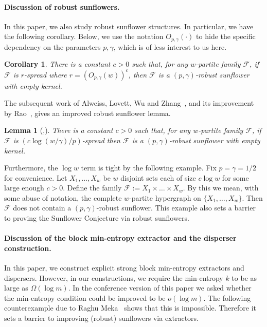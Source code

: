 \documentclass[11pt]{article}
\numberwithin{equation}{section}
\newtheorem{lemma}[theorem]{Lemma}
\newtheorem{corollary}[theorem]{Corollary}
\theoremstyle{definition}
\theoremstyle{plain}
\newcommand{\calF}{\mathcal{F}} %
\begin{document}
\paragraph{Discussion of robust sunflowers.}
In this paper, we also study robust sunflower structures.
In particular, we have the following corollary. Below, we use
the notation $O_{p,\gamma}(\cdot)$ to hide the specific dependency
on the parameters $p,\gamma$, which is of less interest to us here.

\begin{corollary} There is a constant $c>0$ such that, for any
%
$w$-partite  %
family $\calF$, if $\calF$ is $r$-spread where
$r=(O_{p,\gamma} (w))^c$, then $\calF$ is a
$(p, \gamma)$-robust sunflower with empty kernel.
\end{corollary}

The subsequent work of Alweiss, Lovett, Wu and
Zhang~\cite{alweiss2020improved},  and its improvement by
Rao~\cite{rao2020coding},
gives an improved robust sunflower lemma.

\begin{lemma}[\cite{alweiss2020improved},\cite{rao2020coding}]  %
There is a constant $c>0$ such that, for any
$w$-partite family $\calF$,
if $\calF$ is $(c\log(w/\gamma)/p)$-spread then 
$\calF$ is a $(p, \gamma)$-robust sunflower with empty kernel.
\end{lemma}
Furthermore, the $\log w$ term is tight by the following example. Fix
$p=\gamma=1/2$ for convenience. Let $X_1,\dots,X_w$ be $w$ disjoint sets
each of size $c \log w$ for some large enough $c>0$. Define the family
$\calF:=X_{1}\times\dots\times X_w$.
%
%
%
%
By this we mean, with some abuse of notation,
the complete $w$-partite hypergraph on $\{X_1,\dots,X_w\}$.  %
Then $\calF$
does not contain a $(p, \gamma)$-robust sunflower. This example also
sets a barrier to proving 
the Sunflower Conjecture via robust sunflowers.

\paragraph{Discussion of the block min-entropy extractor and
the disperser construction.}

In this paper, we construct explicit strong block min-entropy extractors 
and dispersers. However, 
in our constructions, we require the min-entropy $k$ to be as large as $\Omega(\log m)$. In the conference version of this paper we asked whether the min-entropy condition could be improved to be $o(\log m)$. The following counterexample due to Raghu Meka~\cite{meka2018}
shows that this is impossible. Therefore it
sets a barrier to improving (robust) sunflowers via extractors.
\end{document}
